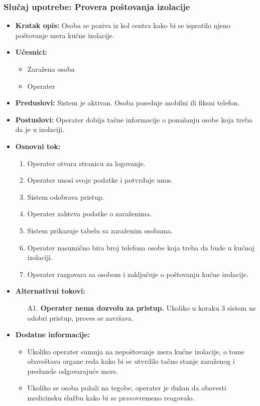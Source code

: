 \documentclass[titlepage]{article}
\begin{document}
\subsubsection{Slučaj upotrebe: Provera poštovanja izolacije}
\begin{itemize}
    \item \textbf{Kratak opis:} Osoba se poziva iz kol centra kako bi se ispratilo njeno poštovanje mera kućne izolacije.
    \item \textbf{Učesnici:}
        \begin{itemize}
            \item Zaražena osoba
            \item Operater
        \end{itemize}
    \item \textbf{Preduslovi:} Sistem je aktivan. Osoba poseduje mobilni ili fiksni telefon.
    \item \textbf{Postuslovi:} Operater dobija tačne informacije o ponašanju osobe koja treba da je u izolaciji.
    \item \textbf{Osnovni tok:}
        \begin{enumerate}
            \item Operater otvara stranicu za logovanje.
            \item Operater unosi svoje podatke i potvrđuje unos.
            \item Sistem odobrava pristup.
            \item Operater zahteva podatke o zaraženima.
            \item Sistem prikazuje tabelu sa zaraženim osobama.
            \item Operater nasumično bira broj telefona osobe koja treba da bude u kućnoj izolaciji.
            \item Operater razgovara sa osobom i zaključuje o poštovanju kućne izolacije.
        \end{enumerate}
    \item\textbf{Alternativni tokovi:}
        \begin{itemize}
            \item[A1.] \textbf{Operater nema dozvolu za pristup.} Ukoliko u koraku 3 sistem ne odobri pristup, proces se završava.
        \end{itemize}
    \item \textbf{Dodatne informacije:}
        \begin{itemize}
            \item Ukoliko operater sumnja na nepoštovanje mera kućne izolacije, o tome obaveštava organe reda kako bi se utvrdilo tačno stanje zaraženog i preduzele odgovarajuće mere.
            \item Ukoliko se osoba požali na tegobe, operater je dužan da obavesti medicinsku službu kako bi se pravovremeno reagovalo.
        \end{itemize}
\end{itemize}
\end{document}
